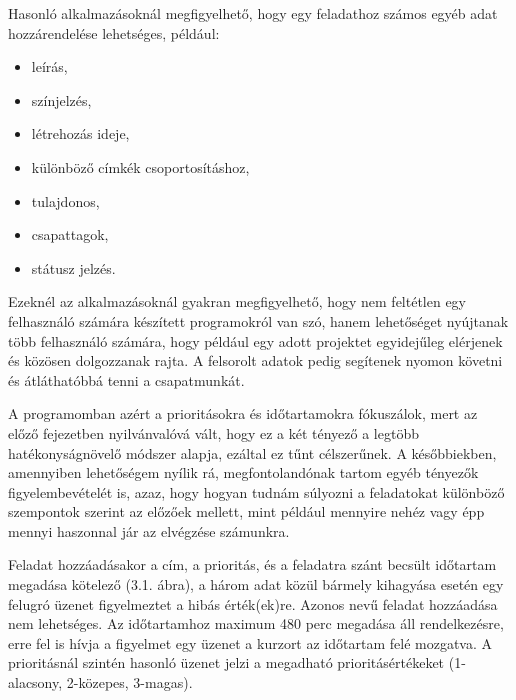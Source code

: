 Hasonló alkalmazásoknál megfigyelhető, hogy egy feladathoz számos egyéb adat hozzárendelése lehetséges, például:

\begin{itemize}
	\item leírás,
	\item színjelzés,
	\item létrehozás ideje,
	\item különböző címkék csoportosításhoz,
	\item tulajdonos,
	\item csapattagok,
	\item státusz jelzés.
\end{itemize}

Ezeknél az alkalmazásoknál gyakran megfigyelhető, hogy nem feltétlen egy felhasználó számára készített programokról van szó, hanem lehetőséget nyújtanak több felhasználó számára, hogy például egy adott projektet egyidejűleg elérjenek és közösen dolgozzanak rajta. A felsorolt adatok pedig segítenek nyomon követni és átláthatóbbá tenni a csapatmunkát.

A programomban azért a prioritásokra és időtartamokra fókuszálok, mert az előző fejezetben nyilvánvalóvá vált, hogy ez a két tényező a legtöbb hatékonyságnövelő módszer alapja, ezáltal ez tűnt célszerűnek. A későbbiekben, amennyiben lehetőségem nyílik rá, megfontolandónak tartom egyéb tényezők figyelembevételét is, azaz, hogy hogyan tudnám súlyozni a feladatokat különböző szempontok szerint az előzőek mellett, mint például mennyire nehéz vagy épp mennyi haszonnal jár az elvégzése számunkra. 

Feladat hozzáadásakor a cím, a prioritás, és a feladatra szánt becsült időtartam megadása kötelező (3.1. ábra), a három adat közül bármely kihagyása esetén egy felugró üzenet figyelmeztet a hibás érték(ek)re. Azonos nevű feladat hozzáadása nem lehetséges. Az időtartamhoz maximum 480 perc megadása áll rendelkezésre, erre fel is hívja a figyelmet egy üzenet a kurzort az időtartam felé mozgatva. A prioritásnál szintén hasonló üzenet jelzi a megadható prioritásértékeket (1-alacsony, 2-közepes, 3-magas).

